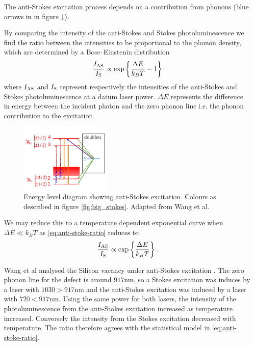 The anti-Stokes excitation process depends on a contribution from phonons (blue arrows in in figure \ref{fig:anti-stokes}).

By comparing the intensity of the anti-Stokes and Stokes photoluminescence we find the ratio between the intensities to be proportional to the phonon density, which are determined by a Bose–Einstenin distribution \cite{Wang2018}
\begin{equation}
	\frac{I_{\ce{AS}}}{I_{\ce{S}}} \propto \exp\left\{\frac{\Delta E}{k_B T} -1 \right\}
	\label{eq:anti-stoke-ratio}
\end{equation}
where $I_{\ce{AS}}$ and $I_{\ce{S}}$ represent respectively the intensities of the anti-Stokes and Stokes photoluminescence at a datum laser power. $\Delta E$ represents the difference in energy between the incident photon and the zero phonon line i.e. the phonon contribution to the excitation.

\begin{figure}%
	\centering%
	\includegraphics[width=0.4\textwidth]{figures/stokes.pdf}
    \caption{Energy level diagram showing anti-Stokes excitation. Colours as described in figure \ref{fig:big_stokes}. Adapted from Wang et al.}
    \label{fig:anti-stokes}
\end{figure}%

We may reduce this to a temperature dependent exponential curve when $\Delta E \ll k_B T$ as \eqref{eq:anti-stoke-ratio} reduces to
\begin{equation}
	\frac{I_{\ce{AS}}}{I_{\ce{S}}} \propto \exp\left\{\frac{\Delta E}{k_B T} \right\}.
	\label{eq:anti-stokes-ratio-reduced}
\end{equation}

Wang et al analysed the Silicon vacancy under anti-Stokes excitation \cite{Wang2021}. The zero phonon line for the defect is around $917$nm, so a Stokes excitation was induces by a laser with $1030 > 917$nm and the anti-Stokes excitation was induced by a laser with $720 < 917$nm. Using the same power for both lasers, the intensity of the photoluminescence from the anti-Stokes excitation increased as temperature increased. Conversely the intensity from the Stokes excitation decreased with temperature. The ratio therefore agrees with the statistical model in \eqref{eq:anti-stoke-ratio}.

